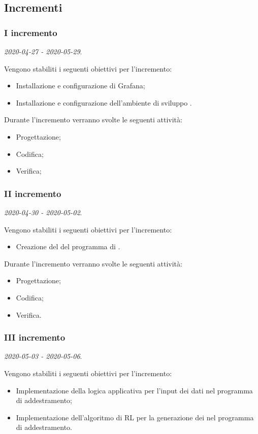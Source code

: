 \documentclass[../piano-di-progetto.tex]{subfiles}
\begin{document}
\subsection{Incrementi}

\subsubsection{I incremento}
\emph{2020-04-27 - 2020-05-29}. 
 
 Vengono stabiliti i seguenti obiettivi per l'incremento:
 \begin{itemize}
     \item Installazione e configurazione di Grafana;
     \item Installazione e configurazione dell'ambiente di sviluppo .
 \end{itemize}

Durante l'incremento verranno svolte le seguenti attività: 
\begin{itemize}
    \item Progettazione;
    \item Codifica;
    \item Verifica;
\end{itemize}

\subsubsection{II incremento}
\emph{2020-04-30 - 2020-05-02}. 
 
 Vengono stabiliti i seguenti obiettivi per l'incremento:
 \begin{itemize}
     \item Creazione del  del programma di .
 \end{itemize}

Durante l'incremento verranno svolte le seguenti attività: 
\begin{itemize}
    \item Progettazione;
    \item Codifica;
    \item Verifica.
\end{itemize}


\subsubsection{III incremento}
\emph{2020-05-03 - 2020-05-06}. 
 
 Vengono stabiliti i seguenti obiettivi per l'incremento:
 \begin{itemize}
     \item Implementazione della logica applicativa per l'input dei dati nel programma di addestramento;
     \item Implementazione dell'algoritmo di RL per la generazione dei  nel programma di addestramento.
 \end{itemize}
\end{document}
